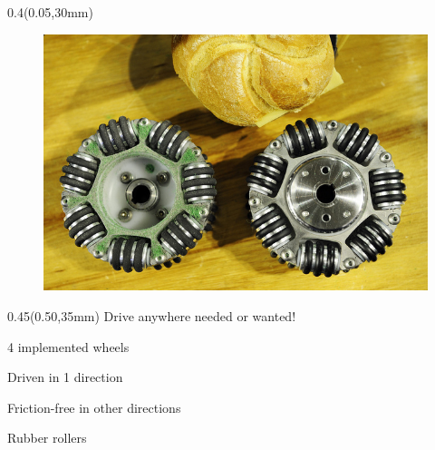 \documentclass[aspectratio=43]{beamer}
\newcommand{\TULeftMargin}{0.05\paperwidth}
\newcommand{\TULeftWidth}{0.4\paperwidth}
\newcommand{\TURightMargin}{0.50\paperwidth}
\newcommand{\TURightWidth}{0.45\paperwidth}
\begin{document}
\begin{frame}
	\end{frame}	
	
%



	\begin{frame}
	
		\begin{textblock*}{\TULeftWidth}(\TULeftMargin,30mm)
			\begin{figure}
				\centering
				\includegraphics[width=1.1\linewidth]{[TechUnitedStyle]/Figures/Omniwielen}
			\end{figure}
		\end{textblock*}
		
		\begin{textblock*}{\TURightWidth}(\TURightMargin,35mm)
			 Drive anywhere needed or wanted!
			\begin{TechUnitedItems}
				\item 4 implemented wheels
				\item Driven in 1 direction
				\item Friction-free in other directions
				\item Rubber rollers	
			
			\end{TechUnitedItems}
			
	\end{textblock*}
	
	\end{frame}
	
\end{document}
